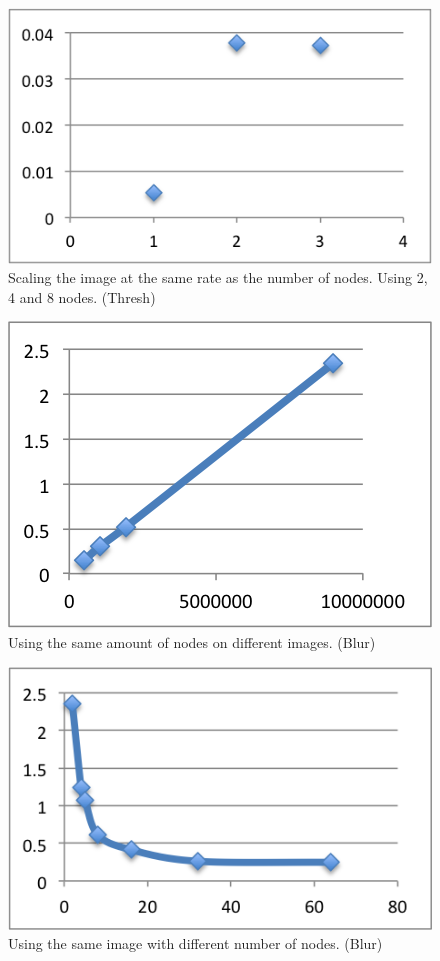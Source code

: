 \documentclass[a4paper]{article}
\begin{document}
\begin{figure}[h]
  \centering
  \includegraphics{samescale.png}
  \caption{Scaling the image at the same rate as the number of nodes. Using 2, 4 and 8 nodes. (Thresh)}
  \label{fig:fig3}
\end{figure}

\begin{figure}[h]
  \centering
  \includegraphics{sameProcessorBlur.png}
  \caption{Using the same amount of nodes on different images. (Blur)}
  \label{fig:fig4}
\end{figure}

\begin{figure}[h]
  \centering
  \includegraphics{samePixelsBlur.png}
  \caption{Using the same image with different number of nodes. (Blur)}
  \label{fig:fig5}
\end{figure}
\end{document}
